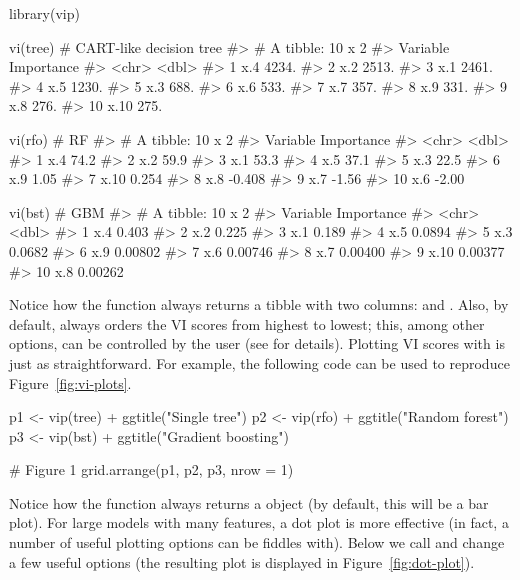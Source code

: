 \begin{example}
library(vip)

vi(tree)  # CART-like decision tree
#> # A tibble: 10 x 2
#>    Variable Importance
#>    <chr>         <dbl>
#>  1 x.4           4234.
#>  2 x.2           2513.
#>  3 x.1           2461.
#>  4 x.5           1230.
#>  5 x.3            688.
#>  6 x.6            533.
#>  7 x.7            357.
#>  8 x.9            331.
#>  9 x.8            276.
#> 10 x.10           275.

vi(rfo)   # RF
#> # A tibble: 10 x 2
#>    Variable Importance
#>    <chr>         <dbl>
#>  1 x.4          74.2  
#>  2 x.2          59.9  
#>  3 x.1          53.3  
#>  4 x.5          37.1  
#>  5 x.3          22.5  
#>  6 x.9           1.05 
#>  7 x.10          0.254
#>  8 x.8          -0.408
#>  9 x.7          -1.56 
#> 10 x.6          -2.00

vi(bst)   # GBM
#> # A tibble: 10 x 2
#>    Variable Importance
#>    <chr>         <dbl>
#>  1 x.4         0.403  
#>  2 x.2         0.225  
#>  3 x.1         0.189  
#>  4 x.5         0.0894 
#>  5 x.3         0.0682 
#>  6 x.9         0.00802
#>  7 x.6         0.00746
#>  8 x.7         0.00400
#>  9 x.10        0.00377
#> 10 x.8         0.00262
\end{example}

Notice how the  function always returns a tibble with two columns:  and . Also, by default,  always orders the VI scores from highest to lowest; this, among other options, can be controlled by the user (see  for details). Plotting VI scores with  is just as straightforward. For example, the following code can be used to reproduce Figure~\ref{fig:vi-plots}.

\begin{example}
p1 <- vip(tree) + ggtitle("Single tree")
p2 <- vip(rfo) + ggtitle("Random forest")
p3 <- vip(bst) + ggtitle("Gradient boosting")

# Figure 1
grid.arrange(p1, p2, p3, nrow = 1)
\end{example}

Notice how the  function always returns a  object (by default, this will be a bar plot). For large models with many features, a dot plot is more effective (in fact, a number of useful plotting options can be fiddles with). Below we call  and change a few useful options (the resulting plot is displayed in Figure~\ref{fig:dot-plot}).

